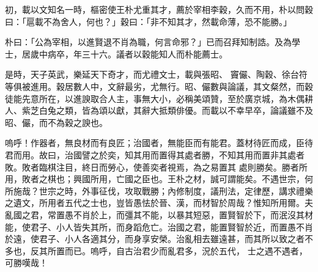 \begin{pinyinscope}
 初，載以文知名一時，樞密使王朴尤重其才，薦於宰相李穀，久而不用，朴以問穀曰：「扈載不為舍人，何也？」穀曰：「非不知其才，然載命薄，恐不能勝。」



 朴曰：「公為宰相，以進賢退不肖為職，何言命邪？」已而召拜知制誥。及為學士，居歲中病卒，年三十六。議者以穀能知人而朴能薦士。



 是時，天子英武，樂延天下奇才，而尤禮文士，載與張昭、
 竇儼、陶穀、徐台符等俱被進用。穀居數人中，文辭最劣，尤無行。昭、儼數與論議，其文粲然，而穀徒能先意所在，以進諛取合人主，事無大小，必稱美頌贊，至於廣京城，為木偶耕人、紫芝白兔之類，皆為頌以獻，其辭大抵類俳優。而載以不幸早卒，論議雖不及昭、儼，而不為穀之諛也。



 嗚呼！作器者，無良材而有良匠；治國者，無能臣而有能君。蓋材待匠而成，臣待君而用。故曰，治國譬之於奕，知其用而置得其處者勝，不知其用而置非其處者敗。敗者臨棋注目，終日而勞心，使善奕者視焉，為之易置其
 處則勝矣。勝者所用，敗者之棋也；興國所用，亡國之臣也。王朴之材，誠可謂能矣。不遇世宗，何所施哉？世宗之時，外事征伐，攻取戰勝；內修制度，議刑法，定律歷，講求禮樂之遺文，所用者五代之士也，豈皆愚怯於晉、漢，而材智於周哉？惟知所用爾。夫亂國之君，常置愚不肖於上，而彊其不能，以暴其短惡，置賢智於下，而泯沒其材能，使君子、小人皆失其所，而身蹈危亡。治國之君，能置賢智於近，而置愚不肖於遠，使君子、小人各適其分，而身享安榮。治亂相去雖遠甚，而其所以致之者不多也，反其所置而已。嗚呼，自古治君少而亂君多，況於五代，
 士之遇不遇者，可勝嘆哉！



\end{pinyinscope}